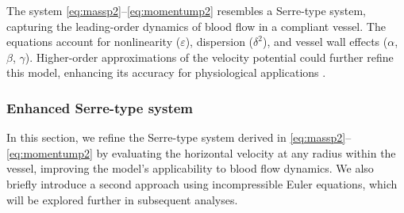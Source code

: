 \documentclass[alpha-refs, 12pt]{wiley-article}
\newcommand{\eps}{\varepsilon}
\begin{document}
The system \eqref{eq:massp2}--\eqref{eq:momentump2} resembles a Serre-type system, capturing the leading-order dynamics of blood flow in a compliant vessel. The equations account for nonlinearity ($\eps$), dispersion ($\delta^2$), and vessel wall effects ($\alpha$, $\beta$, $\gamma$). Higher-order approximations of the velocity potential could further refine this model, enhancing its accuracy for physiological applications \citep{Mitsotakis2019}.

\subsubsection{Enhanced Serre-type system}\label{sec:cbsys}

In this section, we refine the Serre-type system derived in \eqref{eq:massp2}--\eqref{eq:momentump2} by evaluating the horizontal velocity at any radius within the vessel, improving the model's applicability to blood flow dynamics. We also briefly introduce a second approach using incompressible Euler equations, which will be explored further in subsequent analyses.
\end{document}
